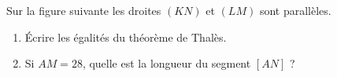 
\begin{exercice}\label{exo2smath-0132}

    Sur la figure suivante les droites \( (KN)\) et \( (LM) \) sont parallèles.
\begin{center}
   
\end{center}

\begin{enumerate}
    \item
        Écrire les égalités du théorème de Thalès.
    \item
        Si \( AM=28\), quelle est la longueur du segment \( [AN]\) ?
\end{enumerate}

\end{exercice}
